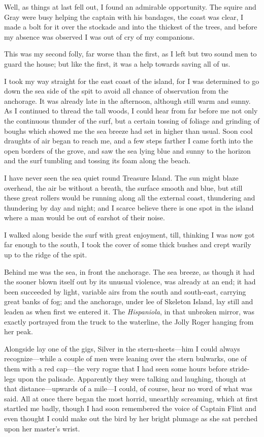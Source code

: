 Well, as things at last fell out, I found an admirable opportunity. The squire and Gray were busy helping the captain with his bandages, the coast was clear, I made a bolt for it over the stockade and into the thickest of the trees, and before my absence was observed I was out of cry of my companions.

This was my second folly, far worse than the first, as I left but two sound men to guard the house; but like the first, it was a help towards saving all of us.

I took my way straight for the east coast of the island, for I was determined to go down the sea side of the spit to avoid all chance of observation from the anchorage. It was already late in the afternoon, although still warm and sunny. As I continued to thread the tall woods, I could hear from far before me not only the continuous thunder of the surf, but a certain tossing of foliage and grinding of boughs which showed me the sea breeze had set in higher than usual. Soon cool draughts of air began to reach me, and a few steps farther I came forth into the open borders of the grove, and saw the sea lying blue and sunny to the horizon and the surf tumbling and tossing its foam along the beach.

I have never seen the sea quiet round Treasure Island. The sun might blaze overhead, the air be without a breath, the surface smooth and blue, but still these great rollers would be running along all the external coast, thundering and thundering by day and night; and I scarce believe there is one spot in the island where a man would be out of earshot of their noise.

I walked along beside the surf with great enjoyment, till, thinking I was now got far enough to the south, I took the cover of some thick bushes and crept warily up to the ridge of the spit.

Behind me was the sea, in front the anchorage. The sea breeze, as though it had the sooner blown itself out by its unusual violence, was already at an end; it had been succeeded by light, variable airs from the south and south-east, carrying great banks of fog; and the anchorage, under lee of Skeleton Island, lay still and leaden as when first we entered it. The \textit{Hispaniola}, in that unbroken mirror, was exactly portrayed from the truck to the waterline, the Jolly Roger hanging from her peak.

Alongside lay one of the gigs, Silver in the stern-sheets—him I could always recognize—while a couple of men were leaning over the stern bulwarks, one of them with a red cap—the very rogue that I had seen some hours before stride-legs upon the palisade. Apparently they were talking and laughing, though at that distance—upwards of a mile—I could, of course, hear no word of what was said. All at once there began the most horrid, unearthly screaming, which at first startled me badly, though I had soon remembered the voice of Captain Flint and even thought I could make out the bird by her bright plumage as she sat perched upon her master's wrist.

